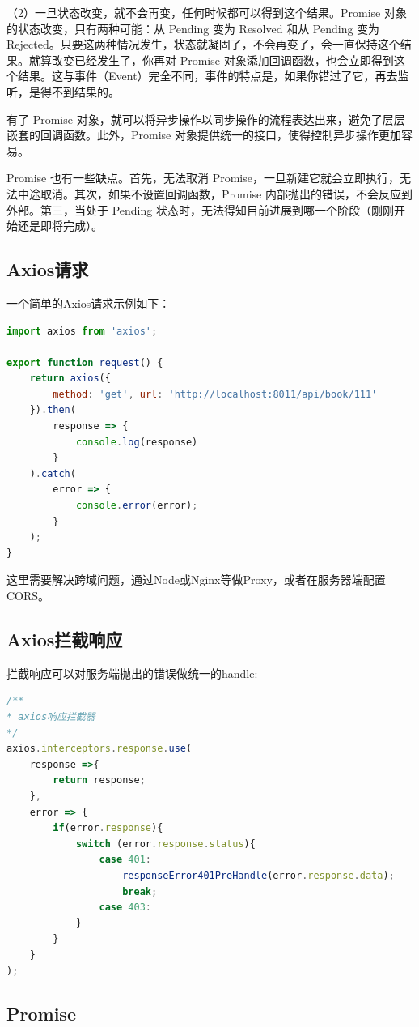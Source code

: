 \documentclass[letter]{book}
\begin{document}
（2）一旦状态改变，就不会再变，任何时候都可以得到这个结果。Promise 对象的状态改变，只有两种可能：从 Pending 变为 Resolved 和从 Pending 变为 Rejected。只要这两种情况发生，状态就凝固了，不会再变了，会一直保持这个结果。就算改变已经发生了，你再对 Promise 对象添加回调函数，也会立即得到这个结果。这与事件（Event）完全不同，事件的特点是，如果你错过了它，再去监听，是得不到结果的。

有了 Promise 对象，就可以将异步操作以同步操作的流程表达出来，避免了层层嵌套的回调函数。此外，Promise 对象提供统一的接口，使得控制异步操作更加容易。

Promise 也有一些缺点。首先，无法取消 Promise，一旦新建它就会立即执行，无法中途取消。其次，如果不设置回调函数，Promise 内部抛出的错误，不会反应到外部。第三，当处于 Pending 状态时，无法得知目前进展到哪一个阶段（刚刚开始还是即将完成）。

\subsection{Axios请求}

一个简单的Axios请求示例如下：

\begin{lstlisting}[language=JavaScript]
import axios from 'axios';

export function request() {
	return axios({
		method: 'get', url: 'http://localhost:8011/api/book/111'
	}).then(
		response => {
			console.log(response)
		}
	).catch(
		error => {
			console.error(error);
		}
	);
}
\end{lstlisting}


这里需要解决跨域问题，通过Node或Nginx等做Proxy，或者在服务器端配置CORS。

\subsection{Axios拦截响应}

拦截响应可以对服务端抛出的错误做统一的handle:

\begin{lstlisting}[language=JavaScript]
/**
* axios响应拦截器
*/
axios.interceptors.response.use(
	response =>{
		return response;
	},
	error => {
		if(error.response){
			switch (error.response.status){
				case 401:
					responseError401PreHandle(error.response.data);
					break;
				case 403:
			}
		}
	}
);
\end{lstlisting}

\subsection{Promise}
\end{document}
